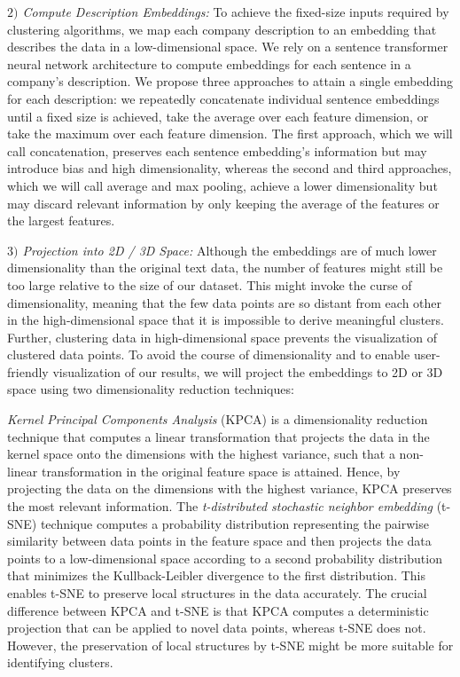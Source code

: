 \documentclass[conference]{IEEEtran}
\begin{document}
\textit{$2)$ Compute Description Embeddings:} To achieve the fixed-size inputs required by clustering algorithms, we map each company description to an embedding that describes the data in a low-dimensional space. We rely on a sentence transformer neural network architecture to compute embeddings for each sentence in a company's description. We propose three approaches to attain a single embedding for each description: we repeatedly concatenate individual sentence embeddings until a fixed size is achieved, take the average over each feature dimension, or take the maximum over each feature dimension. The first approach, which we will call concatenation, preserves each sentence embedding's information but may introduce bias and high dimensionality, whereas the second and third approaches, which we will call average and max pooling, achieve a lower dimensionality but may discard relevant information by only keeping the average of the features or the largest features.

\textit{$3)$ Projection into 2D / 3D Space:} Although the embeddings are of much lower dimensionality than the original text data, the number of features might still be too large relative to the size of our dataset. This might invoke the curse of dimensionality, meaning that the few data points are so distant from each other in the high-dimensional space that it is impossible to derive meaningful clusters. Further, clustering data in high-dimensional space prevents the visualization of clustered data points. To avoid the course of dimensionality and to enable user-friendly visualization of our results, we will project the embeddings to 2D or 3D space using two dimensionality reduction techniques:

\emph{Kernel Principal Components Analysis} (KPCA) is a dimensionality reduction technique that computes a linear transformation that projects the data in the kernel space onto the dimensions with the highest variance, such that a non-linear transformation in the original feature space is attained. Hence, by projecting the data on the dimensions with the highest variance, KPCA preserves the most relevant information.
The \emph{t-distributed stochastic neighbor embedding} (t-SNE) technique computes a probability distribution representing the pairwise similarity between data points in the feature space and then projects the data points to a low-dimensional space according to a second probability distribution that minimizes the Kullback-Leibler divergence to the first distribution. This enables t-SNE to preserve local structures in the data accurately.
The crucial difference between KPCA and t-SNE is that KPCA computes a deterministic projection that can be applied to novel data points, whereas t-SNE does not. However, the preservation of local structures by t-SNE might be more suitable for identifying clusters.
\end{document}

